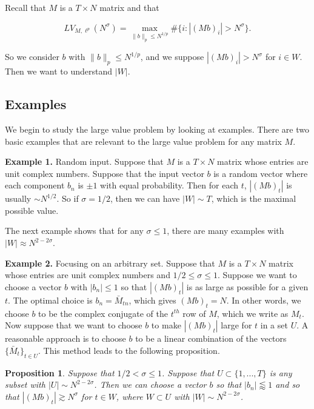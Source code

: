 \documentclass{amsart}
\newtheorem{prop}{Proposition}[section]
\begin{document}
Recall that $M$ is a $T \times N$ matrix and that 

$$LV_{M, \ell^p}(N^\sigma) = \max_{\| b \|_p \le N^{1/p}} \# \{ i: | (Mb)_i | > N^\sigma \}. $$

\noindent So we consider $b$ with $\| b \|_p \le N^{1/p}$,  and we suppose $| (Mb)_i| > N^\sigma$ for $i \in W$.   Then we want to understand $|W|$.  


\subsection{Examples}

We begin to study the large value problem by looking at examples.  There are two basic examples that are relevant to the large value problem for any matrix $M$.  

\vskip10pt

{\bf Example 1.}  Random input.  Suppose that $M$ is a $T \times N$ matrix whose entries are unit complex numbers.  Suppose that the input vector $b$ is a random vector where each component $b_n$ is $\pm 1$ with equal probability.  Then for each $t$, $| (Mb)_t |$ is usually $\sim N^{1/2}$.  So if $\sigma = 1/2$, then we can have $|W| \sim T$, which is the maximal possible value.

\vskip10pt
The next example shows that for any $\sigma \le 1$, there are many examples with $|W| \approx N^{2 - 2 \sigma}$.

\vskip10pt

{\bf Example 2.}  Focusing on an arbitrary set.  Suppose that $M$ is a $T \times N$ matrix whose entries are unit complex numbers and $1/2 \le \sigma \le 1$.   Suppose we want to choose a vector $b$ with $|b_n| \le 1$ so that $| (Mb)_t |$ is as large as possible for a given $t$.  The optimal choice is $b_n = \bar M_{tn}$, which gives $(Mb)_t = N$.  In other words, we choose $b$ to be the complex conjugate of the $t^{th}$ row of $M$, which we write as $M_t$.  Now suppose that we want to choose $b$ to make $| (Mb)_t |$ large for $t$ in a set $U$.  A reasonable approach is to choose $b$ to be a linear combination of the vectors $\{ \bar M_{t} \}_{t \in U}$.  This method leads to the following proposition.


\begin{prop} \label{propfocex}
Suppose that $1/2 < \sigma \le 1$.  Suppose that $U \subset \{1, ..., T \}$ is any subset with $|U| \sim N^{2 - 2 \sigma}$.  Then we can choose a vector $b$ so that $|b_n| \lessapprox 1$ and so that $|(Mb)_t| \gtrsim N^\sigma$ for $t \in W$, where $W \subset U$ with $|W| \sim N^{2 - 2 \sigma}$.
\end{prop}
\end{document}
